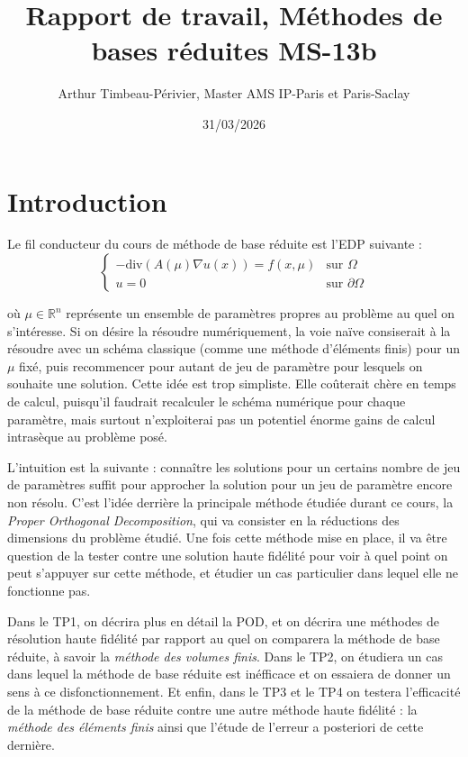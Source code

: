 \documentclass[12pt,a4paper,article]{memoir} %
\title{Rapport de travail, Méthodes de bases réduites MS-13b}
\author{Arthur Timbeau-Périvier, Master AMS IP-Paris et Paris-Saclay}
\date{31/03/2026} %
\begin{document}
\maketitle

\newpage
\tableofcontents

\newpage
\section{Introduction}
Le fil conducteur du cours de méthode de base réduite est l'EDP suivante : 
\begin{equation}
    \label{fil_conduc}
    \begin{cases}
    -\text{div}(A(\mu)\nabla u(x)) = f(x,\mu) & \text{sur } \Omega \\
    u = 0 & \text{sur } \partial \Omega
    \end{cases}
\end{equation}


où $\mu \in \mathbb{R}^n$ représente un ensemble de paramètres propres au problème au quel on s'intéresse. Si on désire la résoudre numériquement, la voie naïve 
consiserait à la résoudre avec un schéma classique (comme une méthode d'éléments finis) pour un $\mu$ fixé, puis recommencer pour autant de jeu de paramètre pour lesquels on souhaite une solution. 
Cette idée est trop simpliste. Elle coûterait chère en temps de calcul, puisqu'il faudrait recalculer le schéma numérique pour chaque paramètre, 
mais surtout n'exploiterai pas un potentiel énorme gains de calcul intrasèque au problème posé. 

\vspace{0.3cm}

L'intuition est la suivante : connaître les solutions pour un certains nombre de jeu de paramètres suffit 
pour approcher la solution pour un jeu de paramètre encore non résolu. C'est l'idée derrière la principale méthode étudiée durant ce cours, 
la \textit{Proper Orthogonal Decomposition}, qui va consister en la réductions des dimensions du problème étudié. Une fois cette méthode mise en place, il va 
être question de la tester contre une solution haute fidélité pour voir à quel point on peut s'appuyer sur cette méthode, et étudier un cas particulier dans lequel 
elle ne fonctionne pas. 

\vspace{0.3cm}

Dans le TP1, on décrira plus en détail la POD, et on décrira une méthodes de résolution haute fidélité par rapport au quel on 
comparera la méthode de base réduite, à savoir la \textit{méthode des volumes finis}. Dans le TP2, on étudiera un cas dans lequel 
la méthode de base réduite est inéfficace et on essaiera de donner un sens à ce disfonctionnement. Et enfin, dans le TP3 et le TP4 on testera 
l'efficacité de la méthode de base réduite contre une autre méthode haute fidélité : la \textit{méthode des éléments finis} ainsi que l'étude de 
l'erreur a posteriori de cette dernière. 
\end{document}
